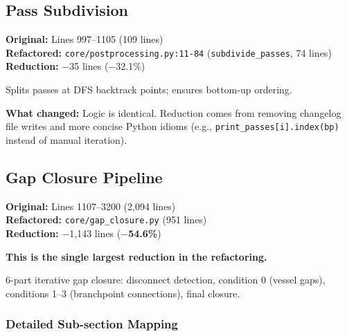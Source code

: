 \documentclass[11pt,letterpaper]{article}
\newcommand{\code}[1]{\texttt{#1}}
\begin{document}
\subsection{Pass Subdivision}

\textbf{Original:} Lines 997--1105 (109 lines)\\
\textbf{Refactored:} \code{core/postprocessing.py:11-84} (\code{subdivide\_passes}, 74 lines)\\
\textbf{Reduction:} $-$35 lines ($-$32.1\%)

Splits passes at DFS backtrack points; ensures bottom-up ordering.

\textbf{What changed:} Logic is identical. Reduction comes from removing changelog file writes and more concise Python idioms (e.g., \code{print\_passes[i].index(bp)} instead of manual iteration).

\subsection{Gap Closure Pipeline}

\textbf{Original:} Lines 1107--3200 (2,094 lines)\\
\textbf{Refactored:} \code{core/gap\_closure.py} (951 lines)\\
\textbf{Reduction:} $-$1,143 lines (\textbf{$-$54.6\%})

\textbf{This is the single largest reduction in the refactoring.}

6-part iterative gap closure: disconnect detection, condition 0 (vessel gaps), conditions 1--3 (branchpoint connections), final closure.

\subsubsection{Detailed Sub-section Mapping}
\end{document}
